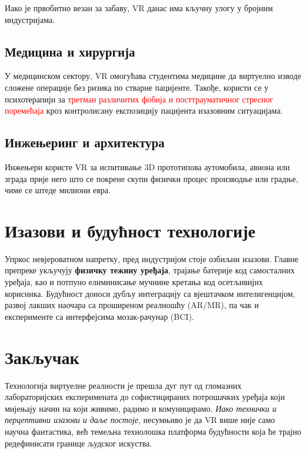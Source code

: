 \documentclass[12pt,a4paper]{article}
\begin{document}
Иако је првобитно везан за забаву, VR данас има кључну улогу у бројним индустријама.

\subsection{Медицина и хирургија}
У медицинском сектору, VR омогућава студентима медицине да виртуелно изводе сложене операције без ризика по стварне пацијенте. Такође, користи се у психотерапији за \textcolor{red}{третман различитих фобија и посттрауматичног стресног поремећаја} кроз контролисану експозицију пацијента изазовним ситуацијама.

\subsection{Инжењеринг и архитектура}
Инжењери користе VR за испитивање 3D прототипова аутомобила, авиона или зграда прије него што се покрене скупи физички процес производње или градње, чиме се штеде милиони евра.

\section{Изазови и будућност технологије}

Упркос невјероватном напретку, пред индустријом стоје озбиљни изазови. Главне препреке укључују \textbf{физичку тежину уређаја}, трајање батерије код самосталних уређаја, као и потпуно елиминисање мучнине кретања код осетљивијих корисника. Будућност доноси дубљу интеграцију са вјештачком интелигенцијом, развој лакших наочара са проширеном реалношћу (AR/MR), па чак и експерименте са интерфејсима мозак-рачунар (BCI).

\section{Закључак}

Технологија виртуелне реалности је прешла дуг пут од гломазних лабораторијских експеримената до софистицираних потрошачких уређаја који мијењају начин на који живимо, радимо и комуницирамо. \textit{Иако технички и перцептивни изазови и даље постоје}, несумњиво је да VR више није само научна фантастика, већ темељна технолошка платформа будућности која ће трајно редефинисати границе људског искуства.
\end{document}
